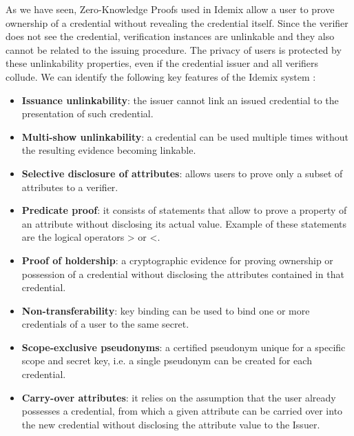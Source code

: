 \hfil

As we have seen, Zero-Knowledge Proofs used in Idemix allow a user to prove ownership of a credential without
revealing the credential itself. Since the verifier does not see the credential, verification
instances are unlinkable and they also cannot be related to the issuing procedure. The privacy of users is protected by these unlinkability properties, even if the credential issuer and all verifiers collude. We can identify the following key features of the Idemix system \citep{vanet}:

\begin{itemize}
		
	\item \textbf{Issuance unlinkability}: the issuer cannot link an issued credential to the presentation of such credential.

	\item \textbf{Multi-show unlinkability}: a credential can be used multiple times without
	the resulting evidence becoming linkable.
	
	\item \textbf{Selective disclosure of attributes}: allows users to prove only a subset of
	attributes to a verifier.
	
	\item \textbf{Predicate proof}: it consists of statements that allow to prove a property
	of an attribute without disclosing its actual value. Example of these statements
	are the logical operators > or <.
	
	\item \textbf{Proof of holdership}: a cryptographic evidence for proving ownership or
	possession of a credential without disclosing the attributes contained in
	that credential.
	
	\item \textbf{Non-transferability}: key binding can be used to bind one or more credentials
	of a user to the same secret.
	
	\item \textbf{Scope-exclusive pseudonyms}: a certified pseudonym unique for a specific
	scope and secret key, i.e. a single pseudonym can be created for each credential.
	
	\item \textbf{Carry-over attributes}: it relies on the assumption that the user already
	possesses a credential, from which a given attribute can be carried over
	into the new credential without disclosing the attribute value to the Issuer.
	

\end{itemize}
